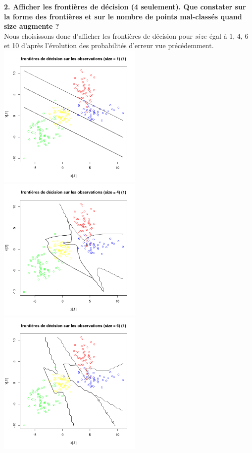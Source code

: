 \documentclass[a4paper, 10pt]{article}
\begin{document}
\textbf{2. Afficher les frontières de décision (4 seulement). Que constater sur la forme des frontières et sur le nombre de points mal-classés quand size augmente ?}\\
Nous choisissons donc d'afficher les frontières de décision pour $size$ égal à 1, 4, 6 et 10 d'après l'évolution des probabilités d'erreur vue précédemment.\\
\includegraphics[height = 7cm, width = 7cm]{plots/frontiere_bayes_q3_2_1.png}
\includegraphics[height = 7cm, width = 7cm]{plots/frontiere_bayes_q3_2_4.png}\\
\includegraphics[height = 7cm, width = 7cm]{plots/frontiere_bayes_q3_2_6.png}
\end{document}
